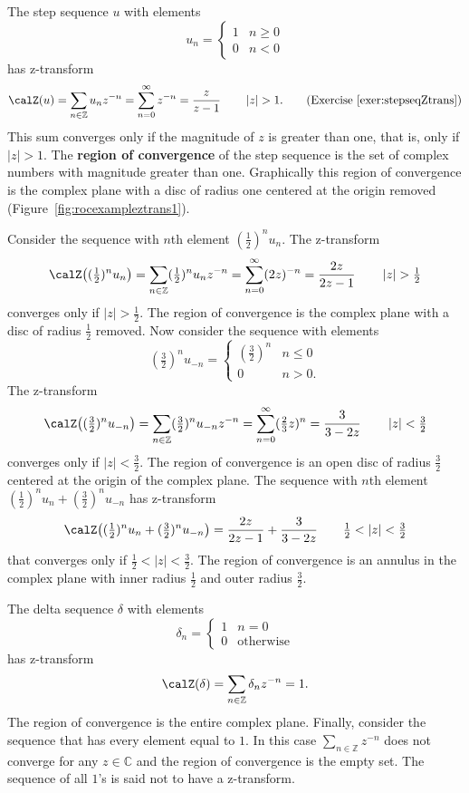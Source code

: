 \documentclass[11pt,a4paper]{book}
\theoremstyle{plain}
\numberwithin{equation}{section}
\newcommand{\ints}{{\mathbb Z}}
\newcommand{\complex}{{\mathbb C}}
\newcommand{\term}{\textbf}
\newcommand{\abs}[1]{\left\vert #1 \right\vert}
\begin{document}
The step sequence $u$ with elements
\[
u_n = \begin{cases} 
1 & n \geq 0 \\
0 & n < 0 
\end{cases}
\]
has z-transform
\[
\calZ(u) = \sum_{n \in \ints} u_n z^{-n} = \sum_{n=0}^\infty z^{-n} = \frac{z}{z - 1} \qquad \abs{z} > 1. \qquad \text{(Exercise~\ref{exer:stepseqZtrans})}
\]
This sum converges only if the magnitude of $z$ is greater than one, that is, only if $\abs{z} > 1$.  The \term{region of convergence} of the step sequence is the set of complex numbers with magnitude greater than one.  Graphically this region of convergence is the complex plane with a disc of radius one centered at the origin removed (Figure~\ref{fig:rocexampleztrans1}).

Consider the sequence with $n$th element $(\tfrac{1}{2})^{n} u_n$.  The z-transform
\[
\calZ\big( (\tfrac{1}{2})^{n} u_n\big) = \sum_{n \in \ints} (\tfrac{1}{2})^{n} u_n z^{-n} = \sum_{n=0}^\infty (2z)^{-n} = \frac{2z}{2z - 1} \qquad \abs{z} > \tfrac{1}{2} 
\]
converges only if $\abs{z} > \tfrac{1}{2}$.  The region of convergence is the complex plane with a disc of radius $\tfrac{1}{2}$ removed.  Now consider the sequence with elements 
\[
(\tfrac{3}{2})^{n} u_{-n} =  \begin{cases} 
(\tfrac{3}{2})^{n} & n \leq 0 \\
0 & n > 0.
\end{cases}
\]
The z-transform
\[
\calZ\big( (\tfrac{3}{2})^n u_{-n} \big) = \sum_{n \in \ints} (\tfrac{3}{2})^{n} u_{-n} z^{-n} = \sum_{n=0}^\infty (\tfrac{2}{3} z)^{n} = \frac{3}{3 - 2z} \qquad \abs{z} < \tfrac{3}{2}
\]
converges only if $\abs{z} < \tfrac{3}{2}$.  The region of convergence is an open disc of radius $\frac{3}{2}$ centered at the origin of the complex plane.  The sequence with $n$th element $(\tfrac{1}{2})^{n} u_n + (\frac{3}{2})^{n} u_{-n}$ has z-transform
\[
\calZ\big((\tfrac{1}{2})^{n} u_n + (\tfrac{3}{2})^{n} u_{-n}\big) =  \frac{2z}{2z - 1} + \frac{3}{3 - 2z} \qquad \tfrac{1}{2} < \abs{z} < \tfrac{3}{2}
\]
that converges only if $\tfrac{1}{2} < \abs{z} < \tfrac{3}{2}$.  The region of convergence is an annulus in the complex plane with inner radius $\tfrac{1}{2}$ and outer radius $\tfrac{3}{2}$.

The delta sequence $\delta$ with elements
\[
\delta_n = \begin{cases}
1 & n = 0 \\
0 & \text{otherwise}
\end{cases}
\]  
has z-transform
\[
\calZ(\delta) = \sum_{n \in \ints} \delta_n z^{-n} = 1.
\]
The region of convergence is the entire complex plane.  Finally, consider the sequence that has every element equal to $1$.  In this case $\sum_{n \in \ints} z^{-n}$ does not converge for any $z \in \complex$ and the region of convergence is the empty set.  The sequence of all $1$'s is said not to have a z-transform.
\end{document}
